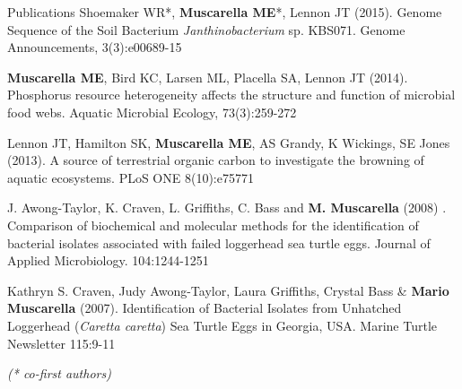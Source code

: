 \documentclass{resume} %
\begin{document}
\begin{rSection}{Publications}
Shoemaker WR*, {\bf Muscarella ME}*, Lennon JT (2015). Genome Sequence of the
Soil Bacterium {\em Janthinobacterium} sp. KBS071. Genome Announcements,
3(3):e00689-15

{\bf Muscarella ME}, Bird KC, Larsen ML, Placella SA, Lennon JT (2014).
Phosphorus resource heterogeneity affects the structure and function of
microbial food webs. Aquatic Microbial Ecology, 73(3):259-272

Lennon JT, Hamilton SK, {\bf Muscarella ME}, AS Grandy, K Wickings, SE Jones
(2013). A source of terrestrial organic carbon to investigate the browning of
aquatic ecosystems. PLoS ONE 8(10):e75771

J. Awong-Taylor, K. Craven, L. Griffiths, C. Bass and {\bf M. Muscarella} (2008)
. Comparison of biochemical and molecular methods for the identification of
bacterial isolates associated with failed loggerhead sea turtle eggs. Journal of
Applied Microbiology. 104:1244-1251

Kathryn S. Craven, Judy Awong-Taylor, Laura Griffiths, Crystal Bass \&
{\bf Mario Muscarella} (2007). Identification of Bacterial Isolates from
Unhatched Loggerhead ({\em Caretta caretta}) Sea Turtle Eggs in Georgia, USA.
Marine Turtle Newsletter 115:9-11

{\em (* co-first authors)}

\end{rSection}

\end{document}
